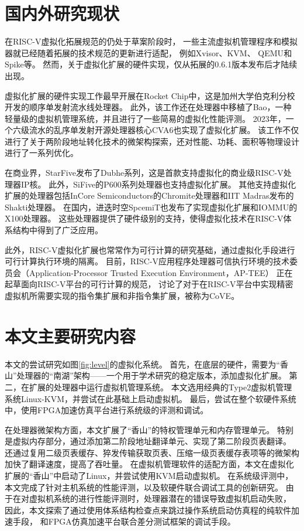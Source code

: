 \section{国内外研究现状}
在RISC-V虚拟化拓展规范的仍处于草案阶段时，
一些主流虚拟机管理程序和模拟器就已经随着拓展的技术规范的更新进行适配，
例如Xvisor\cite{pdp2015xvisor}、KVM\cite{kvm:H-ext}、
QEMU\cite{qemu-riscv:H-ext}和Spike\cite{github:spike}等。
然而，关于虚拟化扩展的硬件实现，仅从拓展的0.6.1版本发布后才陆续出现。

虚拟化扩展的硬件实现工作最早开展在Rocket Chip\cite{itco2022rocket}中，这是加州大学伯克利分校开发的顺序单发射流水线处理器。
此外，该工作还在处理器中移植了Bao，一种轻量级的虚拟机管理系统\cite{ng-res2020bao}，并且进行了一些简易的虚拟化性能评测。
2023年，一个六级流水的乱序单发射开源处理器核心CVA6\cite{tvlsi2023cva6}也实现了虚拟化扩展。
该工作不仅进行了关于两阶段地址转化技术的微架构探索，还对性能、功耗、面积等物理设计进行了一系列优化。

在商业界，StarFive发布了Dubhe系列，这是首款支持虚拟化的商业级RISC-V处理器IP核。
此外，SiFive的P600系列处理器也支持虚拟化扩展。
其他支持虚拟化扩展的处理器包括InCore Semiconductors的Chromite处理器和IIT Madras发布的Shakti处理器。
在国内，进迭时空SpcemiT也发布了实现虚拟化扩展和IOMMU的X100处理器。
这些处理器提供了硬件级别的支持，使得虚拟化技术在RISC-V体系结构中得到了广泛应用。

此外，RISC-V虚拟化扩展也常常作为可行计算的研究基础，通过虚拟化手段进行可行计算执行环境的隔离。
目前，RISC-V应用程序处理器可信执行环境的技术委员会（Application-Processor Trusted Execution Environment，AP-TEE）
正在起草面向RISC-V平台的可行计算的规范，
讨论了对于在RISC-V平台中实现精密虚拟机所需要实现的指令集扩展和非指令集扩展，被称为CoVE\cite{sahita2023cove}。

\section{本文主要研究内容}
本文的尝试研究如图\ref{fig:level}的虚拟化系统。
首先，在底层的硬件，需要为“香山”处理器的“南湖”架构——一个用于学术研究的稳定版本，添加虚拟化扩展。
第二，在扩展的处理器中运行虚拟机管理系统。
本文选用经典的Type2虚拟机管理系统Linux-KVM\cite{kvm:H-ext}，并尝试在此基础上启动虚拟机。
最后，尝试在整个软硬件系统中，使用FPGA加速仿真平台进行系统级的评测和调试。

在处理器微架构方面，本文扩展了“香山”的特权管理单元和内存管理单元。
特别是虚拟内存部分，通过添加第二阶段地址翻译单元、实现了第二阶段页表翻译。
还通过复用二级页表缓存、猝发传输获取页表、压缩一级页表缓存表项等的微架构加快了翻译速度，提高了吞吐量。
在虚拟机管理软件的适配方面，本文在虚拟化扩展的“香山”中启动了Linux，并尝试使用KVM启动虚拟机。
在系统级评测中，本文完成了针对主机系统的性能评测，以及软硬件联合调试工具的创新研究。
由于在对虚拟机系统的进行性能评测时，处理器潜在的错误导致虚拟机启动失败，
因此，本文探索了通过使用体系结构检查点来跳过操作系统启动仿真程的纯软件加速手段，
和FPGA仿真加速平台联合差分测试框架的调试手段。

